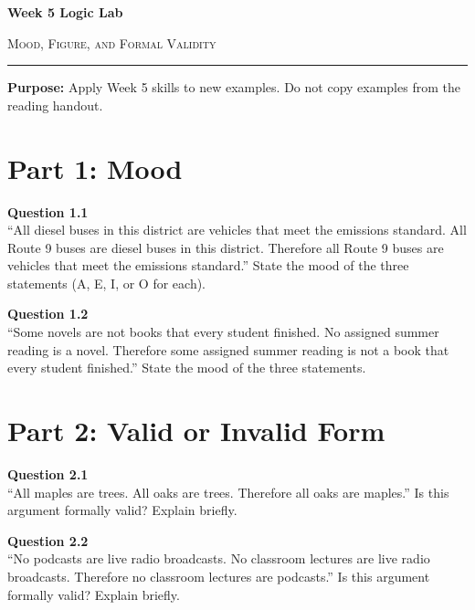 \documentclass[12pt]{article}
\begin{document}
\begin{center}
{\LARGE\bfseries Week 5 Logic Lab}\par\vspace{0.05em}
{\large\scshape Mood, Figure, and Formal Validity}\par\vspace{0.1em}
\rule{0.78\textwidth}{0.5pt}\par\vspace{0.15em}
\end{center}

\noindent\textbf{Purpose:} Apply Week 5 skills to new examples. Do not copy examples from the reading handout.

\vspace{0.3em}

\section*{Part 1: Mood}

\textbf{Question 1.1}\\[-0.15em]
``All diesel buses in this district are vehicles that meet the emissions standard. All Route 9 buses are diesel buses in this district. Therefore all Route 9 buses are vehicles that meet the emissions standard.'' State the mood of the three statements (A, E, I, or O for each).


\textbf{Question 1.2}\\[-0.15em]
``Some novels are not books that every student finished. No assigned summer reading is a novel. Therefore some assigned summer reading is not a book that every student finished.'' State the mood of the three statements.


\newpage

\section*{Part 2: Valid or Invalid Form}

\textbf{Question 2.1}\\[-0.15em]
``All maples are trees. All oaks are trees. Therefore all oaks are maples.'' Is this argument formally valid? Explain briefly.


\textbf{Question 2.2}\\[-0.15em]
``No podcasts are live radio broadcasts. No classroom lectures are live radio broadcasts. Therefore no classroom lectures are podcasts.'' Is this argument formally valid? Explain briefly.
\end{document}
